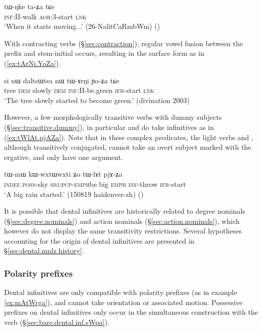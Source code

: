 \begin{exe} 
\ex \label{ex:tWNke.taZa.tCe}
\gll tɯ-ŋke ta-ʑa tɕe \\
\textsc{inf}:\textsc{II}-walk \textsc{aor}:3\flobv{}-start  \textsc{lnk} \\
\glt `When it starts moving...' (26-NalitCaRmbWm) ()
\end{exe} 

 
With contracting verbs (§\ref{sec:contraction}), regular vowel fusion between the  prefix and stem-initial   occurs, resulting in the surface form  as in (\ref{ex:tArNi.YoZa}).

\begin{exe} 
\ex \label{ex:tArNi.YoZa}
\gll si nɯ daltsɯtsa nɯ tɯ-ɤrŋi ɲo-ʑa tɕe \\
tree \textsc{dem} slowly \textsc{dem} \textsc{inf}:II-be.green \textsc{ifr}-start \textsc{lnk} \\
\glt `The tree slowly started to become green.' (divination 2003)
\end{exe} 

However, a few morphologically transitive verbs with dummy subjects (§\ref{sec:transitive.dummy}), in particular  and  do take  infinitives as in (\ref{ex:tWlAt.pjAZa}).  Note that in these complex predicates, the light verbs  and , although transitively conjugated, cannot take an overt subject marked with the ergative, and only have one argument.
 
\begin{exe}
\ex  \label{ex:tWlAt.pjAZa}
\gll tɯ-mɯ kɯ-wxtɯ\redp{}wxti ʑo tɯ-lɤt pjɤ-ʑa \\
\textsc{indef}.\textsc{poss}-sky \textsc{sbj}:\textsc{pcp}-\textsc{emph}\redp{}be.big \textsc{emph} \textsc{inf}-throw \textsc{ifr}-start \\
\glt `A big rain started.' (150819 haidenver-zh) ()
\end{exe}

It is possible that dental infinitives are historically related to degree nominals (§\ref{sec:degree.nominals}) and action nominals (§\ref{sec:action.nominals}), which however do not display the same transitivity restrictions. Several hypotheses accounting for the origin of dental infinitives are presented in §\ref{sec:dental.nmlz.history}.

\subsubsection{Polarity prefixes} \label{sec:dental.inf.polarity}
Dental infinitives are only compatible with polarity prefixes (as in example \ref{ex:mAtWrga}), and cannot take orientation or associated motion. Possessive prefixes on dental infinitives only occur in the simultaneous construction with the verb  (§\ref{sec:bare.dental.inf.sWpa}).


